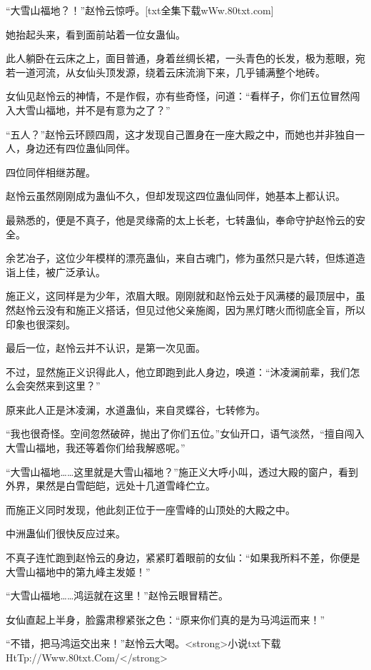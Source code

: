 
\begin{this_body}

“大雪山福地？！”赵怜云惊呼。[txt全集下载wWw.80txt.com]

她抬起头来，看到面前站着一位女蛊仙。

此人躺卧在云床之上，面目普通，身着丝绸长裙，一头青色的长发，极为惹眼，宛若一道河流，从女仙头顶发源，绕着云床流淌下来，几乎铺满整个地砖。

女仙见赵怜云的神情，不是作假，亦有些奇怪，问道：“看样子，你们五位冒然闯入大雪山福地，并不是有意为之了？”

“五人？”赵怜云环顾四周，这才发现自己置身在一座大殿之中，而她也并非独自一人，身边还有四位蛊仙同伴。

四位同伴相继苏醒。

赵怜云虽然刚刚成为蛊仙不久，但却发现这四位蛊仙同伴，她基本上都认识。

最熟悉的，便是不真子，他是灵缘斋的太上长老，七转蛊仙，奉命守护赵怜云的安全。

余艺冶子，这位少年模样的漂亮蛊仙，来自古魂门，修为虽然只是六转，但炼道造诣上佳，被广泛承认。

施正义，这同样是为少年，浓眉大眼。刚刚就和赵怜云处于风满楼的最顶层中，虽然赵怜云没有和施正义搭话，但见过他父亲施阁，因为黑灯瞎火而彻底全盲，所以印象也很深刻。

最后一位，赵怜云并不认识，是第一次见面。

不过，显然施正义识得此人，他立即跑到此人身边，唤道：“沐凌澜前辈，我们怎么会突然来到这里？”

原来此人正是沐凌澜，水道蛊仙，来自灵蝶谷，七转修为。

“我也很奇怪。空间忽然破碎，抛出了你们五位。”女仙开口，语气淡然，“擅自闯入大雪山福地，我还等着你们给我解惑呢。”

“大雪山福地……这里就是大雪山福地？”施正义大呼小叫，透过大殿的窗户，看到外界，果然是白雪皑皑，远处十几道雪峰伫立。

而施正义同时发现，他此刻正位于一座雪峰的山顶处的大殿之中。

中洲蛊仙们很快反应过来。

不真子连忙跑到赵怜云的身边，紧紧盯着眼前的女仙：“如果我所料不差，你便是大雪山福地中的第九峰主发姬！”

“大雪山福地……鸿运就在这里！”赵怜云眼冒精芒。

女仙直起上半身，脸露肃穆紧张之色：“原来你们真的是为马鸿运而来！”

“不错，把马鸿运交出来！”赵怜云大喝。<strong>小说txt下载HtTp://Www.80txt.Com/</strong>


\end{this_body}
